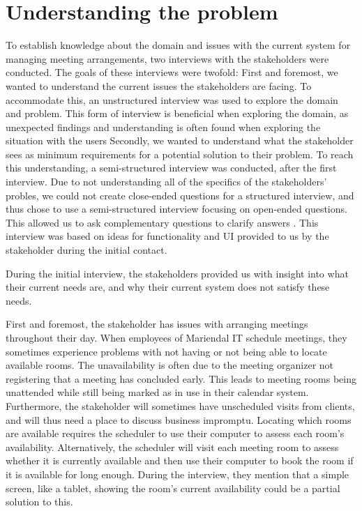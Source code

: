 \section{Understanding the problem}\label{sec:understanding_the_problem} %
To establish knowledge about the domain and issues with the current system for managing meeting arrangements, two interviews with the stakeholders were conducted. 
The goals of these interviews were twofold: 
First and foremost, we wanted to understand the current issues the stakeholders are facing. 
To accommodate this, an unstructured interview was used to explore the domain and problem\cite{benyon2013designing}. 
This form of interview is beneficial when exploring the domain, as unexpected findings and understanding is often found when exploring the situation with the users\cite{benyon2013designing} 
Secondly, we wanted to understand what the stakeholder sees as minimum requirements for a potential solution to their problem. 
To reach this understanding, a semi-structured interview was conducted, after the first interview.
Due to not understanding all of the specifics of the stakeholders' probles, we could not create close-ended questions for a structured interview, and thus chose to use a semi-structured interview focusing on open-ended questions. This allowed us to ask complementary questions to clarify answers \cite{InterviewsNHS}.
This interview was based on ideas for functionality and UI provided to us by the stakeholder during the initial contact.


During the initial interview, the stakeholders provided us with insight into what their current needs are, and why their current system does not satisfy these needs.

First and foremost, the stakeholder has issues with arranging meetings throughout their day.
When employees of Mariendal IT schedule meetings, they sometimes experience problems with not having or not being able to locate available rooms.
The unavailability is often due to the meeting organizer not registering that a meeting has concluded early.
This leads to meeting rooms being unattended while still being marked as in use in their calendar system.
Furthermore, the stakeholder will sometimes have unscheduled visits from clients, and will thus need a place to discuss business impromptu. 
Locating which rooms are available requires the scheduler to use their computer to assess each room's availability.
Alternatively, the scheduler will visit each meeting room to assess whether it is currently available and then use their computer to book the room if it is available for long enough.
During the interview, they mention that a simple screen, like a tablet, showing the room's current availability could be a partial solution to this.


